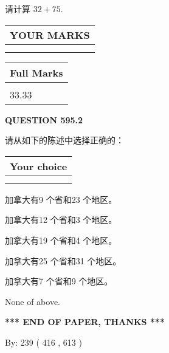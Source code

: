 \documentclass{ctexart}
\begin{document}
  
 
请计算 $ %
32 +  %
75 $.
 

 

 
  
\vspace{0.2in}
  
\noindent\begin{tabular}{|l|}
\hline
 YOUR MARKS  \\
\hline
 \\ 
 \\ 
\hline
\end{tabular}
\hspace{0.05in} \begin{tabular}{|l|}
\hline
 Full Marks  \\
\hline
 \\ 
33.33 \\
\hline
\end{tabular}
{\textbf{\Large{QUESTION
595.2 
}}}
  
  
请从如下的陈述中选择正确的：
  
  
\noindent\hspace{3.0in} \begin{tabular}{|l|}
\hline
Your choice \\
\hline
 \\ 
 \\ 
\hline
\end{tabular}
  
  
 
 
加拿大有9 个省和23 个地区。
 
 
加拿大有12 个省和3 个地区。
 
 
加拿大有19 个省和4 个地区。
 
 
加拿大有25 个省和31 个地区。
 
 
加拿大有7 个省和9 个地区。
 
 
 None of above.
 
 
   
   
 \vspace{0.2in}
 
   
   
   
   
\vspace{1.0in} 
{\textbf{\large{ *** END OF PAPER, THANKS *** }}} 
   
   
\hspace{1.0in} By: 
 239 ( 416 ,  613 )
   
\end{document}
